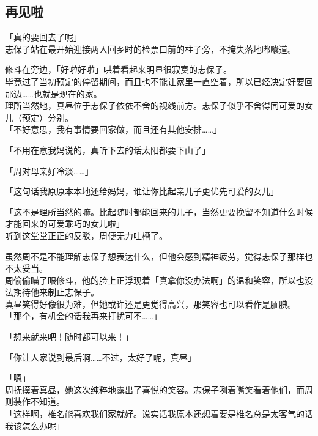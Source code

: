 \subsection{再见啦}

「真的要回去了呢」\\

志保子站在最开始迎接两人回乡时的检票口前的柱子旁，不掩失落地嘟囔道。

修斗在旁边，「好啦好啦」哄着看起来明显很寂寞的志保子。\\

毕竟过了当初预定的停留期间，而且也不能让家里一直空着，所以已经决定好要回那边……也就是现在的家。\\

理所当然地，真昼位于志保子依依不舍的视线前方。志保子似乎不舍得同可爱的女儿（预定）分别。\\

「不好意思，我有事情要回家做，而且还有其他安排……」

「不用在意我妈说的，真听下去的话太阳都要下山了」

「周对母亲好冷淡……」

「这句话我原原本本地还给妈妈，谁让你比起亲儿子更优先可爱的女儿」

「这不是理所当然的嘛。比起随时都能回来的儿子，当然更要挽留不知道什么时候才能回来的可爱乖巧的女儿啦」\\

听到这堂堂正正的反驳，周便无力吐槽了。

虽然周不是不能理解志保子想表达什么，但他会感到精神疲劳，觉得志保子那样也不太妥当。\\

周偷偷瞄了眼修斗，他的脸上正浮现着「真拿你没办法啊」的温和笑容，所以也没法期待他来制止志保子。\\

真昼笑得好像很为难，但她或许还是更觉得高兴，那笑容也可以看作是腼腆。\\

「那个，有机会的话我再来打扰可不……」

「想来就来吧！随时都可以来！」

「你让人家说到最后啊……不过，太好了呢，真昼」

「嗯」\\

周抚摸着真昼，她这次纯粹地露出了喜悦的笑容。志保子咧着嘴笑看着他们，而周则装作不知道。\\

「这样啊，椎名能喜欢我们家就好。说实话我原本还想着要是椎名总是太客气的话我该怎么办呢」

